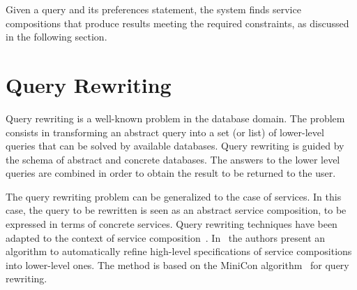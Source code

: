  
 
 Given a query and its preferences statement, the system  finds  service compositions that produce results   meeting the required constraints, as discussed in the following section.
 
\section{Query Rewriting}
\label{sec:queryRew}

Query rewriting is a well-known problem in the database domain.
The problem consists in transforming an abstract query into a set (or list) of lower-level queries that can be solved by  available databases.
Query rewriting is guided by the schema of  abstract and concrete databases.
The answers to the lower level queries are combined in order to obtain the result to be returned to the user.

The query rewriting problem can be generalized to the case of services.
In this case, the query to be rewritten is seen as an abstract service composition, to be expressed in terms of concrete services.
Query rewriting techniques have been adapted to the context of service composition~\cite{BBM10,ZLC11,CostaAMR13}. 
In~\cite{CostaAMR13} the authors present an algorithm to automatically refine high-level specifications of service compositions into lower-level ones. 
The method is based on the MiniCon algorithm~\cite{PH01} for query rewriting.

